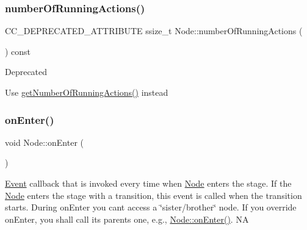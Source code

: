 \subsubsection{\texorpdfstring{number\+Of\+Running\+Actions()}{numberOfRunningActions()}\hspace{0.1cm}{\footnotesize\ttfamily [2/2]}}
{\footnotesize\ttfamily C\+C\+\_\+\+D\+E\+P\+R\+E\+C\+A\+T\+E\+D\+\_\+\+A\+T\+T\+R\+I\+B\+U\+TE ssize\+\_\+t Node\+::number\+Of\+Running\+Actions (\begin{DoxyParamCaption}{ }\end{DoxyParamCaption}) const\hspace{0.3cm}{\ttfamily [inline]}}

\begin{DoxyRefDesc}{Deprecated}
\item[\hyperlink{deprecated__deprecated000262}{Deprecated}]Use \hyperlink{classNode_a576446fef9c35a1a06535eb8949df2f3}{get\+Number\+Of\+Running\+Actions()} instead \end{DoxyRefDesc}
\mbox{\label{classNode_a7f51764c4afd5018a052b9ef71c03374}} 
\subsubsection{\texorpdfstring{on\+Enter()}{onEnter()}\hspace{0.1cm}{\footnotesize\ttfamily [1/2]}}
{\footnotesize\ttfamily void Node\+::on\+Enter (\begin{DoxyParamCaption}\item[{void}]{ }\end{DoxyParamCaption})\hspace{0.3cm}{\ttfamily [virtual]}}

\hyperlink{classEvent}{Event} callback that is invoked every time when \hyperlink{classNode}{Node} enters the \textquotesingle{}stage\textquotesingle{}. If the \hyperlink{classNode}{Node} enters the \textquotesingle{}stage\textquotesingle{} with a transition, this event is called when the transition starts. During on\+Enter you can\textquotesingle{}t access a \char`\"{}sister/brother\char`\"{} node. If you override on\+Enter, you shall call its parent\textquotesingle{}s one, e.\+g., \hyperlink{classNode_a7f51764c4afd5018a052b9ef71c03374}{Node\+::on\+Enter()}.  NA 

